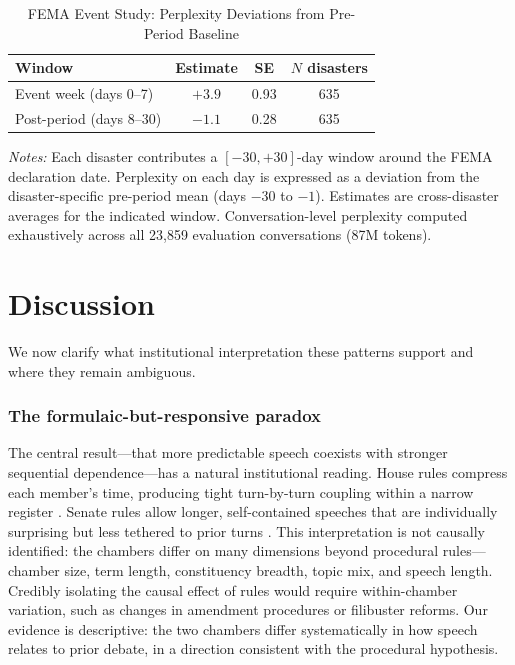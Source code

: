 \documentclass[12pt]{article}
\begin{document}
\begin{table}[H]
\centering
\caption{FEMA Event Study: Perplexity Deviations from Pre-Period Baseline}
\label{tab:fema}
\begin{threeparttable}
\begin{tabular}{lccc}
\toprule
Window & Estimate & SE & $N$ disasters \\
\midrule
Event week (days 0--7) & $+3.9$ & 0.93 & 635 \\
Post-period (days 8--30) & $-1.1$ & 0.28 & 635 \\
\bottomrule
\end{tabular}
\begin{tablenotes}[flushleft]
\small
\item \textit{Notes:} Each disaster contributes a $[-30, +30]$-day window around the FEMA declaration date. Perplexity on each day is expressed as a deviation from the disaster-specific pre-period mean (days $-30$ to $-1$). Estimates are cross-disaster averages for the indicated window. Conversation-level perplexity computed exhaustively across all 23,859 evaluation conversations (87M tokens).
\end{tablenotes}
\end{threeparttable}
\end{table}


\section{Discussion}

We now clarify what institutional interpretation these patterns support and where they remain ambiguous.

\subsubsection*{The formulaic-but-responsive paradox} The central result---that more predictable speech coexists with stronger sequential dependence---has a natural institutional reading. House rules compress each member's time, producing tight turn-by-turn coupling within a narrow register \citep{perssonTabellini2003, jenkins2006}. Senate rules allow longer, self-contained speeches that are individually surprising but less tethered to prior turns \citep{lee2009}. This interpretation is not causally identified: the chambers differ on many dimensions beyond procedural rules---chamber size, term length, constituency breadth, topic mix, and speech length. Credibly isolating the causal effect of rules would require within-chamber variation, such as changes in amendment procedures or filibuster reforms. Our evidence is descriptive: the two chambers differ systematically in how speech relates to prior debate, in a direction consistent with the procedural hypothesis.
\end{document}
